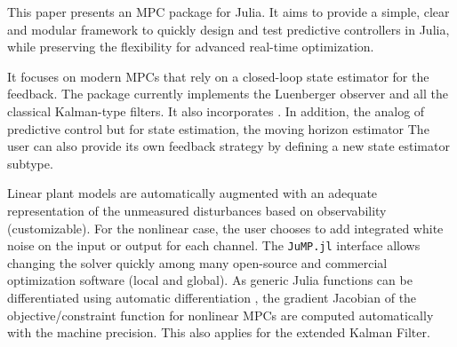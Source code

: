 This paper presents an MPC package for Julia. It aims to provide a simple, clear and modular framework to quickly design and test predictive controllers in Julia, while preserving the flexibility for advanced real-time optimization. 

It focuses on modern MPCs that rely on a closed-loop state estimator for the feedback. The package currently implements the Luenberger observer and all the classical Kalman-type filters. It also incorporates . In addition, the analog of predictive control but for state estimation, the moving horizon estimator The user can also provide its own feedback strategy by defining a new state estimator subtype.

Linear plant models are automatically augmented with an adequate representation of the unmeasured disturbances based on observability (customizable). For the nonlinear case, the user chooses to add integrated white noise on the input or output for each channel. The \texttt{JuMP.jl} interface allows changing the solver quickly among  many open-source and commercial optimization software (local and global). As generic Julia functions can be differentiated using automatic differentiation , the gradient Jacobian of the objective/constraint function for nonlinear MPCs are computed automatically with the machine precision. This also applies for the extended Kalman Filter. 

